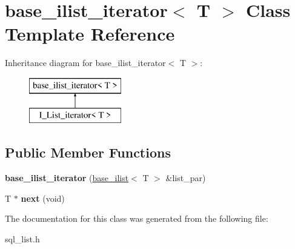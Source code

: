 \hypertarget{classbase__ilist__iterator}{}\section{base\+\_\+ilist\+\_\+iterator$<$ T $>$ Class Template Reference}
\label{classbase__ilist__iterator}
Inheritance diagram for base\+\_\+ilist\+\_\+iterator$<$ T $>$\+:\begin{figure}[H]
\begin{center}
\leavevmode
\includegraphics[height=2.000000cm]{classbase__ilist__iterator}
\end{center}
\end{figure}
\subsection*{Public Member Functions}
\begin{DoxyCompactItemize}
\item 
\mbox{\label{classbase__ilist__iterator_a49f9608c8ef8a1fd6faa1ebaa35b5fd8}} 
{\bfseries base\+\_\+ilist\+\_\+iterator} (\mbox{\hyperlink{classbase__ilist}{base\+\_\+ilist}}$<$ T $>$ \&list\+\_\+par)
\item 
\mbox{\label{classbase__ilist__iterator_ade1a03e1a0859070fa019cfbfb510b51}} 
T $\ast$ {\bfseries next} (void)
\end{DoxyCompactItemize}


The documentation for this class was generated from the following file\+:\begin{DoxyCompactItemize}
\item 
sql\+\_\+list.\+h\end{DoxyCompactItemize}
